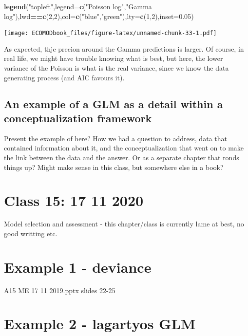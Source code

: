 \documentclass[
]{book}
\newenvironment{Shaded}{\begin{snugshade}}{\end{snugshade}}
\newcommand{\AttributeTok}[1]{\textcolor[rgb]{0.13,0.29,0.53}{#1}}
\newcommand{\DecValTok}[1]{\textcolor[rgb]{0.00,0.00,0.81}{#1}}
\newcommand{\FloatTok}[1]{\textcolor[rgb]{0.00,0.00,0.81}{#1}}
\newcommand{\FunctionTok}[1]{\textcolor[rgb]{0.13,0.29,0.53}{\textbf{#1}}}
\newcommand{\NormalTok}[1]{#1}
\newcommand{\SpecialCharTok}[1]{\textcolor[rgb]{0.81,0.36,0.00}{\textbf{#1}}}
\newcommand{\StringTok}[1]{\textcolor[rgb]{0.31,0.60,0.02}{#1}}
\begin{document}
\begin{Shaded}
\begin{Highlighting}[]
\FunctionTok{legend}\NormalTok{(}\StringTok{"topleft"}\NormalTok{,}\AttributeTok{legend=}\FunctionTok{c}\NormalTok{(}\StringTok{"Poisson log"}\NormalTok{,}\StringTok{"Gamma log"}\NormalTok{),lwd}\SpecialCharTok{==}\FunctionTok{c}\NormalTok{(}\DecValTok{2}\NormalTok{,}\DecValTok{2}\NormalTok{),}\AttributeTok{col=}\FunctionTok{c}\NormalTok{(}\StringTok{"blue"}\NormalTok{,}\StringTok{"green"}\NormalTok{),}\AttributeTok{lty=}\FunctionTok{c}\NormalTok{(}\DecValTok{1}\NormalTok{,}\DecValTok{2}\NormalTok{),}\AttributeTok{inset=}\FloatTok{0.05}\NormalTok{)}
\end{Highlighting}
\end{Shaded}

\texttt{[image: ECOMODbook\_files/figure-latex/unnamed-chunk-33-1.pdf]}

As expected, thje precion around the Gamma predictions is larger. Of course, in real life, we might have trouble knowing what is best, but here, the lower variance of the Poisson is what is the real variance, since we know the data generating process (and AIC favours it).

\section{An example of a GLM as a detail within a conceptualization framework}\label{an-example-of-a-glm-as-a-detail-within-a-conceptualization-framework}

Present the example of \citet{Filipe2004} here? How we had a question to address, data that contained information about it, and the conceptualization that went on to make the link between the data and the answer. Or as a separate chapter that ronds things up? Might make sense in this class, but somewhere else in a book?

\chapter{Class 15: 17 11 2020}\label{aula15}

Model selection and assessment - this chapter/class
is currently lame at best, no good writting etc.

\chapter{Example 1 - deviance}\label{example-1---deviance}

A15 ME 17 11 2019.pptx
slides 22-25

\chapter{Example 2 - lagartyos GLM}\label{example-2---lagartyos-glm}
\end{document}
